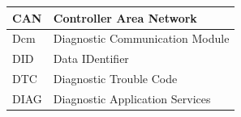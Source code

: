\begin{longtable}{|l|l|}
\begin{minipage}{0.31\linewidth}\raggedright\vspace{.75ex}CAN\vspace{.75ex}\end{minipage} & \begin{minipage}{0.63\linewidth}\raggedright\vspace{.75ex}Controller Area Network\vspace{.75ex}\end{minipage}\\\hline
\begin{minipage}{0.31\linewidth}\raggedright\vspace{.75ex}Dcm\vspace{.75ex}\end{minipage} & \begin{minipage}{0.63\linewidth}\raggedright\vspace{.75ex}Diagnostic Communication Module\vspace{.75ex}\end{minipage}\\\hline
\begin{minipage}{0.31\linewidth}\raggedright\vspace{.75ex}DID\vspace{.75ex}\end{minipage} & \begin{minipage}{0.63\linewidth}\raggedright\vspace{.75ex}Data IDentifier\vspace{.75ex}\end{minipage}\\\hline
\begin{minipage}{0.31\linewidth}\raggedright\vspace{.75ex}DTC\vspace{.75ex}\end{minipage} & \begin{minipage}{0.63\linewidth}\raggedright\vspace{.75ex}Diagnostic Trouble Code\vspace{.75ex}\end{minipage}\\\hline
\begin{minipage}{0.31\linewidth}\raggedright\vspace{.75ex}DIAG\vspace{.75ex}\end{minipage} & \begin{minipage}{0.63\linewidth}\raggedright\vspace{.75ex}Diagnostic Application Services\vspace{.75ex}\end{minipage}\\\hline

\end{longtable}
